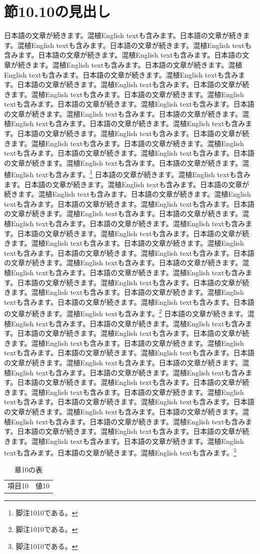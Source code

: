 \documentclass[pdflatex,book]{jlreq}
\begin{document}
\section{節10.10の見出し}
日本語の文章が続きます。混植English textも含みます。日本語の文章が続きます。混植English textも含みます。日本語の文章が続きます。混植English textも含みます。日本語の文章が続きます。混植English textも含みます。日本語の文章が続きます。混植English textも含みます。日本語の文章が続きます。混植English textも含みます。日本語の文章が続きます。混植English textも含みます。日本語の文章が続きます。混植English textも含みます。日本語の文章が続きます。混植English textも含みます。日本語の文章が続きます。混植English textも含みます。日本語の文章が続きます。混植English textも含みます。日本語の文章が続きます。混植English textも含みます。日本語の文章が続きます。混植English textも含みます。日本語の文章が続きます。混植English textも含みます。日本語の文章が続きます。混植English textも含みます。日本語の文章が続きます。混植English textも含みます。日本語の文章が続きます。混植English textも含みます。日本語の文章が続きます。混植English textも含みます。日本語の文章が続きます。混植English textも含みます。日本語の文章が続きます。混植English textも含みます。\footnote{脚注1010である。}
日本語の文章が続きます。混植English textも含みます。日本語の文章が続きます。混植English textも含みます。日本語の文章が続きます。混植English textも含みます。日本語の文章が続きます。混植English textも含みます。日本語の文章が続きます。混植English textも含みます。日本語の文章が続きます。混植English textも含みます。日本語の文章が続きます。混植English textも含みます。日本語の文章が続きます。混植English textも含みます。日本語の文章が続きます。混植English textも含みます。日本語の文章が続きます。混植English textも含みます。日本語の文章が続きます。混植English textも含みます。日本語の文章が続きます。混植English textも含みます。日本語の文章が続きます。混植English textも含みます。日本語の文章が続きます。混植English textも含みます。日本語の文章が続きます。混植English textも含みます。日本語の文章が続きます。混植English textも含みます。日本語の文章が続きます。混植English textも含みます。日本語の文章が続きます。混植English textも含みます。日本語の文章が続きます。混植English textも含みます。日本語の文章が続きます。混植English textも含みます。\footnote{脚注1010である。}
日本語の文章が続きます。混植English textも含みます。日本語の文章が続きます。混植English textも含みます。日本語の文章が続きます。混植English textも含みます。日本語の文章が続きます。混植English textも含みます。日本語の文章が続きます。混植English textも含みます。日本語の文章が続きます。混植English textも含みます。日本語の文章が続きます。混植English textも含みます。日本語の文章が続きます。混植English textも含みます。日本語の文章が続きます。混植English textも含みます。日本語の文章が続きます。混植English textも含みます。日本語の文章が続きます。混植English textも含みます。日本語の文章が続きます。混植English textも含みます。日本語の文章が続きます。混植English textも含みます。日本語の文章が続きます。混植English textも含みます。日本語の文章が続きます。混植English textも含みます。日本語の文章が続きます。混植English textも含みます。日本語の文章が続きます。混植English textも含みます。日本語の文章が続きます。混植English textも含みます。日本語の文章が続きます。混植English textも含みます。日本語の文章が続きます。混植English textも含みます。\footnote{脚注1010である。}
\begin{table}[htbp]\centering\caption{章10の表}\begin{tabular}{cc}項目10 & 値10\\\end{tabular}\end{table}
\end{document}
